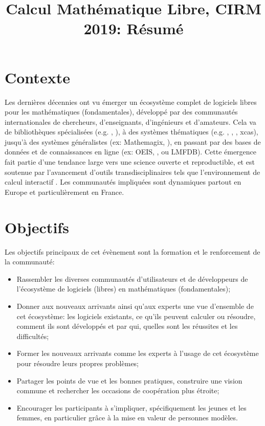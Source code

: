 \documentclass[12pt]{amsart}
\begin{document}
\title{Calcul Mathématique Libre, CIRM 2019: Résumé}
\maketitle
\thispagestyle{empty}

\section*{Contexte}
Les dernières décennies ont vu émerger un écosystème complet de logiciels libres pour les mathématiques (fondamentales), développé par des communautés internationales de chercheurs, d'enseignants, d'ingénieurs et d'amateurs. Cela va de bibliothèques spécialisées (e.g. \MPIR, \Linbox), à des systèmes thématiques (e.g. \GAP, \Pari, \Singular, xcas), jusqu'à des systèmes généralistes (ex: Mathemagix, \Sage), en passant par des bases de données et de connaissances en ligne (ex: OEIS, \MathHub, ou LMFDB). Cette émergence fait partie d'une tendance large vers une science ouverte et reproductible,  et est soutenue par l'avancement d'outils transdisciplinaires tels que l'environnement de calcul interactif \Jupyter. Les communautés impliquées sont dynamiques partout en Europe et particulièrement en France.

\section*{Objectifs}
Les objectifs principaux de cet évènement sont la formation et le renforcement de la communauté:
\begin{itemize}
\item Rassembler les diverses communautés d'utilisateurs et de développeurs de l'écosystème de logiciels (libres) en mathématiques (fondamentales);
\item Donner aux nouveaux arrivants ainsi qu'aux experts une vue d'ensemble de cet écosystème: les logiciels existants, ce qu'ils peuvent calculer ou résoudre, comment ils sont développés et par qui, quelles sont les réussites et les difficultés;
\item Former les nouveaux arrivants comme les experts à l'usage de cet écosystème pour résoudre leurs propres problèmes;
\item Partager les points de vue et les bonnes pratiques, construire une vision commune et rechercher les occasions de coopération plus étroite;
\item Encourager les participants à s'impliquer, spécifiquement les jeunes et les femmes, en particulier grâce à la mise en valeur de personnes modèles.
\end{itemize}
\end{document}

